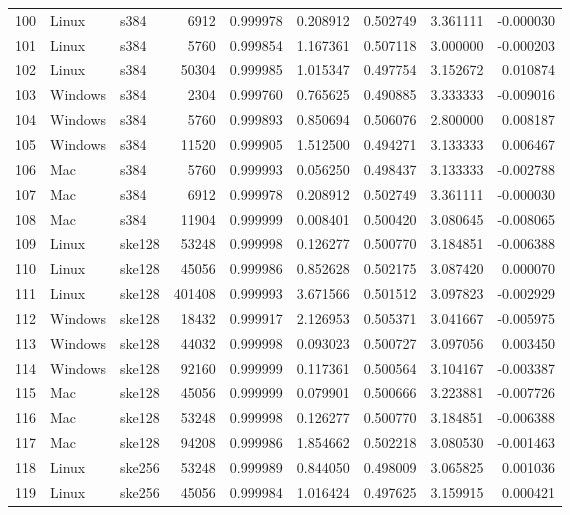 \documentclass{IEEEtran}
\begin{document}
\begin{longtable}{rllrrrrrr}
  100 & Linux & s384 &    6912 & 0.999978 & 0.208912 & 0.502749 & 3.361111 & -0.000030 \\ 
  101 & Linux & s384 &    5760 & 0.999854 & 1.167361 & 0.507118 & 3.000000 & -0.000203 \\ 
  102 & Linux & s384 &   50304 & 0.999985 & 1.015347 & 0.497754 & 3.152672 & 0.010874 \\ 
  103 & Windows & s384 &    2304 & 0.999760 & 0.765625 & 0.490885 & 3.333333 & -0.009016 \\ 
  104 & Windows & s384 &    5760 & 0.999893 & 0.850694 & 0.506076 & 2.800000 & 0.008187 \\ 
  105 & Windows & s384 &   11520 & 0.999905 & 1.512500 & 0.494271 & 3.133333 & 0.006467 \\ 
  106 & Mac & s384 &    5760 & 0.999993 & 0.056250 & 0.498437 & 3.133333 & -0.002788 \\ 
  107 & Mac & s384 &    6912 & 0.999978 & 0.208912 & 0.502749 & 3.361111 & -0.000030 \\ 
  108 & Mac & s384 &   11904 & 0.999999 & 0.008401 & 0.500420 & 3.080645 & -0.008065 \\ 
  109 & Linux & ske128 &   53248 & 0.999998 & 0.126277 & 0.500770 & 3.184851 & -0.006388 \\ 
  110 & Linux & ske128 &   45056 & 0.999986 & 0.852628 & 0.502175 & 3.087420 & 0.000070 \\ 
  111 & Linux & ske128 &  401408 & 0.999993 & 3.671566 & 0.501512 & 3.097823 & -0.002929 \\ 
  112 & Windows & ske128 &   18432 & 0.999917 & 2.126953 & 0.505371 & 3.041667 & -0.005975 \\ 
  113 & Windows & ske128 &   44032 & 0.999998 & 0.093023 & 0.500727 & 3.097056 & 0.003450 \\ 
  114 & Windows & ske128 &   92160 & 0.999999 & 0.117361 & 0.500564 & 3.104167 & -0.003387 \\ 
  115 & Mac & ske128 &   45056 & 0.999999 & 0.079901 & 0.500666 & 3.223881 & -0.007726 \\ 
  116 & Mac & ske128 &   53248 & 0.999998 & 0.126277 & 0.500770 & 3.184851 & -0.006388 \\ 
  117 & Mac & ske128 &   94208 & 0.999986 & 1.854662 & 0.502218 & 3.080530 & -0.001463 \\ 
  118 & Linux & ske256 &   53248 & 0.999989 & 0.844050 & 0.498009 & 3.065825 & 0.001036 \\ 
  119 & Linux & ske256 &   45056 & 0.999984 & 1.016424 & 0.497625 & 3.159915 & 0.000421 \\ 

\end{longtable}
\end{document}
